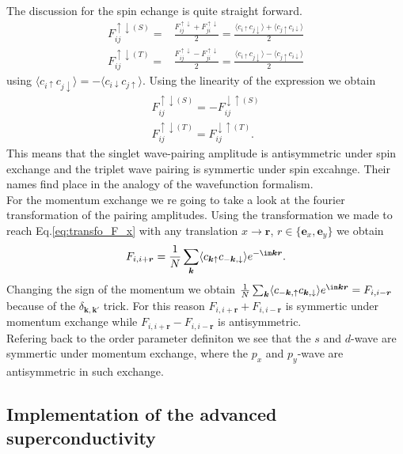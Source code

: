 \documentclass[../main.tex]{subfile}
\begin{document}
The discussion for the spin echange is quite straight forward.
\begin{align*}
    F_{ij}^{\uparrow\downarrow(S)} =& \frac{F_{ij}^{\uparrow\downarrow} + F_{ji}^{\uparrow\downarrow}}{2} = \frac{\langle c_{i\uparrow}c_{j\downarrow}\rangle + \langle c_{j\uparrow}c_{i\downarrow}\rangle}{2}\\
    F_{ij}^{\uparrow\downarrow(T)} =& \frac{F_{ij}^{\uparrow\downarrow} - F_{ji}^{\uparrow\downarrow}}{2} = \frac{\langle c_{i\uparrow}c_{j\downarrow}\rangle - \langle c_{j\uparrow}c_{i\downarrow}\rangle}{2}
\end{align*}
 using $\langle c_{i\uparrow}c_{j\downarrow}\rangle = -\langle c_{i\downarrow}c_{j\uparrow}\rangle$. Using the linearity of the expression we obtain
\begin{align*}
    F_{ij}^{\uparrow\downarrow(S)} = - F_{ij}^{\downarrow\uparrow(S)}\\
    F_{ij}^{\uparrow\downarrow(T)} = F_{ij}^{\downarrow\uparrow(T)}.
\end{align*}
This means that the singlet wave-pairing amplitude is antisymmetric under spin exchange and the triplet wave pairing is symmertic under spin excahnge. Their names
find place in the analogy of the wavefunction formalism.\\

For the momentum exchange we re going to take a look at the fourier transformation of the pairing amplitudes. Using the transformation we made to 
reach Eq.\ref{eq:transfo_F_x} with any translation $ x \rightarrow \bm{r}$, $r\in \{\bm{e}_x,\bm{e}_y\}$ we obtain
\begin{align*}
    F_{i,i+ \bm{r}} = \frac{1}{N} \sum_{\bm{k}} \langle c_{\bm{k}\uparrow} c_{-\bm{k},\downarrow}\rangle e^{-\im\bm{k}\bm{r}}.
\end{align*}
Changing the sign of the momentum we obtain  $\frac{1}{N} \sum_{\bm{k}} \langle c_{-\bm{k},\uparrow} c_{\bm{k},\downarrow}\rangle e^{\im\bm{k}\bm{r}} =  F_{i,i- \bm{r}}$
because of the $\delta_{\bm{k},\bm{k}'}$ trick. For this reason $F_{i,i+ \bm{r}} +  F_{i,i- \bm{r}}$ is symmertic under momentum exchange while $F_{i,i+ \bm{r}} -  F_{i,i- \bm{r}}$ is antisymmetric.\\
Refering back to the order parameter definiton we see that the $s$ and $d$-wave are symmertic under momentum exchange, where the $p_x$ and $p_y$-wave are antisymmetric in such exchange.\\

\subsection{Implementation of the advanced superconductivity}
\end{document}
